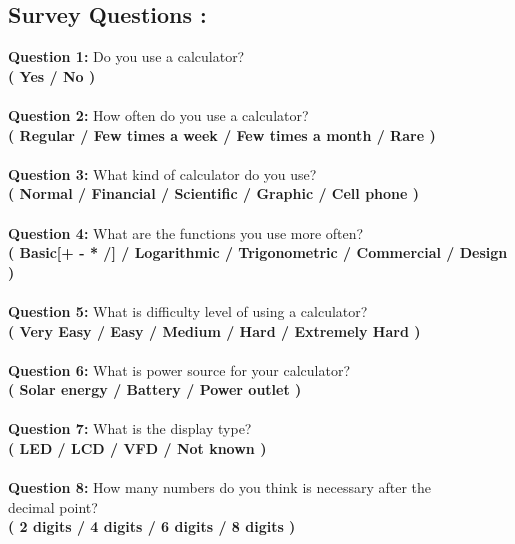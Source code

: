 \documentclass{article}
\begin{document}
\subsection{Survey Questions :}
\textbf{Question 1:} Do you use a calculator? \\ \textbf{( Yes / No )}\\ \\
\textbf{Question 2:} How often do you use a calculator? \\ \textbf{( Regular / Few times a week / Few times a month / Rare )}\\ \\
\textbf{Question 3:} What kind of calculator do you use? \\ \textbf{( Normal / Financial / Scientific / Graphic / Cell phone )}\\ \\
\textbf{Question 4:} What are the functions you use more often? \\ \textbf{( Basic[+ - * /] / Logarithmic / Trigonometric / Commercial / Design )}\\ \\
\textbf{Question 5:} What is difficulty level of using a calculator? \\ \textbf{( Very Easy / Easy / Medium / Hard / Extremely Hard )}\\ \\
\textbf{Question 6:} What is power source for your calculator? \\ \textbf{( Solar energy / Battery / Power outlet )}\\ \\
\textbf{Question 7:} What is the display type? \\ \textbf{( LED / LCD / VFD / Not known )}\\ \\
\textbf{Question 8:} How many numbers do you think is necessary after the \\decimal point? \\ \textbf{( 2 digits / 4 digits / 6 digits / 8 digits )}\\ 
\end{document}
